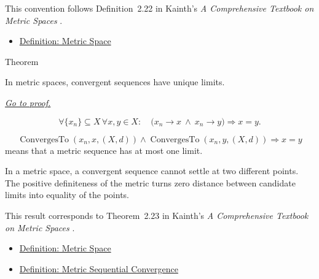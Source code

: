 \begin{remark*}
This convention follows Definition~2.22 in Kainth's
\emph{A Comprehensive Textbook on Metric Spaces}
\cite{KainthComprehensiveMetricSpaces2023}.
\end{remark*}

\begin{dependencies}
\begin{itemize}
  \item \hyperref[def:metric-space]{Definition: Metric Space}
\end{itemize}
\end{dependencies}

\begin{theorembox}{Theorem}
\begin{theorem}
\label{thm:metric-convergent-sequences-unique-limits}
In metric spaces, convergent sequences have unique limits.

\smallskip
\noindent
\hyperref[prf:metric-convergent-sequences-unique-limits]{\textit{Go to proof.}}
\end{theorem}
\end{theorembox}

\begin{remark*}
\[
\forall \{x_n\}\subseteq X\,\forall x,y\in X{:}\quad
\bigl(x_n\to x\ \land\ x_n\to y\bigr)
\Longrightarrow
x=y.
\]
\end{remark*}

\begin{remark*}
\[
\operatorname{ConvergesTo}(x_n,x,(X,d))
\land
\operatorname{ConvergesTo}(x_n,y,(X,d))
\Longrightarrow x=y
\]
means that a metric sequence has at most one limit.
\end{remark*}

\begin{remark*}[Interpretation]
In a metric space, a convergent sequence cannot settle at two different
points.  The positive definiteness of the metric turns zero distance between
candidate limits into equality of the points.
\end{remark*}

\begin{remark*}
This result corresponds to Theorem~2.23 in Kainth's
\emph{A Comprehensive Textbook on Metric Spaces}
\cite{KainthComprehensiveMetricSpaces2023}.
\end{remark*}

\begin{dependencies}
\begin{itemize}
  \item \hyperref[def:metric-space]{Definition: Metric Space}
  \item \hyperref[def:metric-sequential-convergence]{Definition: Metric Sequential Convergence}
\end{itemize}
\end{dependencies}

